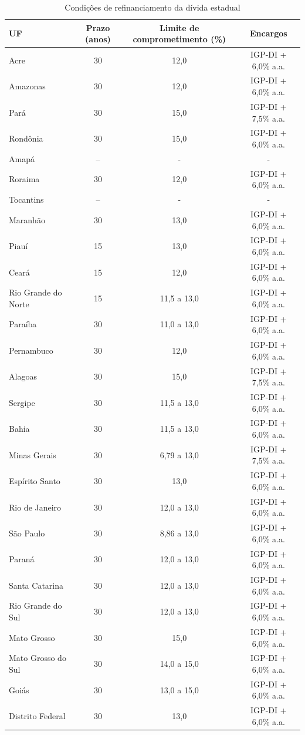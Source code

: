 \begin{table}[!htbp]
\centering
\caption{Condições de refinanciamento da dívida estadual}
\label{tab:tetos}
\small
\begin{tabular}{@{}lccc@{}}
\toprule
UF & Prazo (anos) & Limite de comprometimento (\%) & Encargos\\
\midrule
Acre & 30 & 12,0 & IGP-DI + 6,0\% a.a.\\
Amazonas & 30 & 12,0 & IGP-DI + 6,0\% a.a.\\
Pará & 30 & 15,0 & IGP-DI + 7,5\% a.a.\\
Rondônia & 30 & 15,0 & IGP-DI + 6,0\% a.a.\\
Amapá & -- & - & -\\
Roraima & 30 & 12,0 & IGP-DI + 6,0\% a.a.\\
Tocantins & -- & - & -\\
\midrule
Maranhão & 30 & 13,0 & IGP-DI + 6,0\% a.a.\\
Piauí & 15 & 13,0 & IGP-DI + 6,0\% a.a.\\
Ceará & 15 & 12,0 & IGP-DI + 6,0\% a.a.\\
Rio Grande do Norte & 15 & 11,5 a 13,0 & IGP-DI + 6,0\% a.a.\\
Paraíba & 30 & 11,0 a 13,0 & IGP-DI + 6,0\% a.a.\\
Pernambuco & 30 & 12,0 & IGP-DI + 6,0\% a.a.\\
Alagoas & 30 & 15,0 & IGP-DI + 7,5\% a.a.\\
Sergipe & 30 & 11,5 a 13,0 & IGP-DI + 6,0\% a.a.\\
Bahia & 30 & 11,5 a 13,0 & IGP-DI + 6,0\% a.a.\\
\midrule
Minas Gerais & 30 & 6,79 a 13,0 & IGP-DI + 7,5\% a.a.\\
Espírito Santo & 30 & 13,0 & IGP-DI + 6,0\% a.a.\\
Rio de Janeiro & 30 & 12,0 a 13,0 & IGP-DI + 6,0\% a.a.\\
São Paulo & 30 & 8,86 a 13,0 & IGP-DI + 6,0\% a.a.\\
\midrule
Paraná & 30 & 12,0 a 13,0 & IGP-DI + 6,0\% a.a.\\
Santa Catarina & 30 & 12,0 a 13,0 & IGP-DI + 6,0\% a.a.\\
Rio Grande do Sul & 30 & 12,0 a 13,0 & IGP-DI + 6,0\% a.a.\\
\midrule
Mato Grosso & 30 & 15,0 & IGP-DI + 6,0\% a.a.\\
Mato Grosso do Sul & 30 & 14,0 a 15,0 & IGP-DI + 6,0\% a.a.\\
Goiás & 30 & 13,0 a 15,0 & IGP-DI + 6,0\% a.a.\\
Distrito Federal & 30 & 13,0 & IGP-DI + 6,0\% a.a.\\
\bottomrule
\end{tabular}

\end{table}